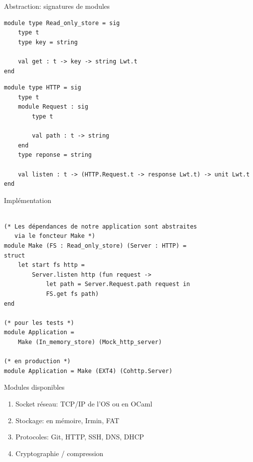 \begin{frame}[fragile]{Abstraction: signatures de modules}

\begin{lstlisting}
module type Read_only_store = sig
    type t
    type key = string

    val get : t -> key -> string Lwt.t
end
\end{lstlisting}

\begin{lstlisting}
module type HTTP = sig
    type t
    module Request : sig
        type t

        val path : t -> string
    end
    type reponse = string

    val listen : t -> (HTTP.Request.t -> response Lwt.t) -> unit Lwt.t
end
\end{lstlisting}


\end{frame}

\begin{frame}[fragile]{Implémentation}

\begin{lstlisting}

(* Les dépendances de notre application sont abstraites
   via le foncteur Make *)
module Make (FS : Read_only_store) (Server : HTTP) =
struct
    let start fs http =
        Server.listen http (fun request ->
            let path = Server.Request.path request in
            FS.get fs path)
end

(* pour les tests *)
module Application =
    Make (In_memory_store) (Mock_http_server)

(* en production *)
module Application = Make (EXT4) (Cohttp.Server)
\end{lstlisting}

\end{frame}

\begin{frame}{Modules disponibles}
\begin{enumerate}[label=$-$]
    \item Socket réseau: TCP/IP de l'OS ou en OCaml
    \item Stockage: en mémoire, Irmin, FAT
    \item Protocoles: Git, HTTP, SSH, DNS, DHCP
    \item Cryptographie / compression
\end{enumerate}
\end{frame}

%
%
